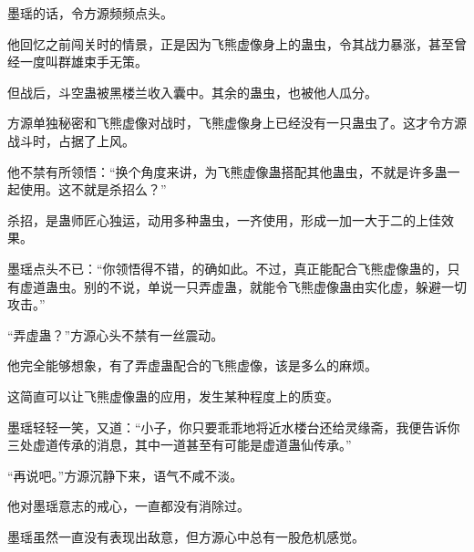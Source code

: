 \begin{this_body}
墨瑶的话，令方源频频点头。

他回忆之前闯关时的情景，正是因为飞熊虚像身上的蛊虫，令其战力暴涨，甚至曾经一度叫群雄束手无策。

但战后，斗空蛊被黑楼兰收入囊中。其余的蛊虫，也被他人瓜分。

方源单独秘密和飞熊虚像对战时，飞熊虚像身上已经没有一只蛊虫了。这才令方源战斗时，占据了上风。

他不禁有所领悟：“换个角度来讲，为飞熊虚像蛊搭配其他蛊虫，不就是许多蛊一起使用。这不就是杀招么？”

杀招，是蛊师匠心独运，动用多种蛊虫，一齐使用，形成一加一大于二的上佳效果。

墨瑶点头不已：“你领悟得不错，的确如此。不过，真正能配合飞熊虚像蛊的，只有虚道蛊虫。别的不说，单说一只弄虚蛊，就能令飞熊虚像蛊由实化虚，躲避一切攻击。”

“弄虚蛊？”方源心头不禁有一丝震动。

他完全能够想象，有了弄虚蛊配合的飞熊虚像，该是多么的麻烦。

这简直可以让飞熊虚像蛊的应用，发生某种程度上的质变。

墨瑶轻轻一笑，又道：“小子，你只要乖乖地将近水楼台还给灵缘斋，我便告诉你三处虚道传承的消息，其中一道甚至有可能是虚道蛊仙传承。”

“再说吧。”方源沉静下来，语气不咸不淡。

他对墨瑶意志的戒心，一直都没有消除过。

墨瑶虽然一直没有表现出敌意，但方源心中总有一股危机感觉。

\end{this_body}

